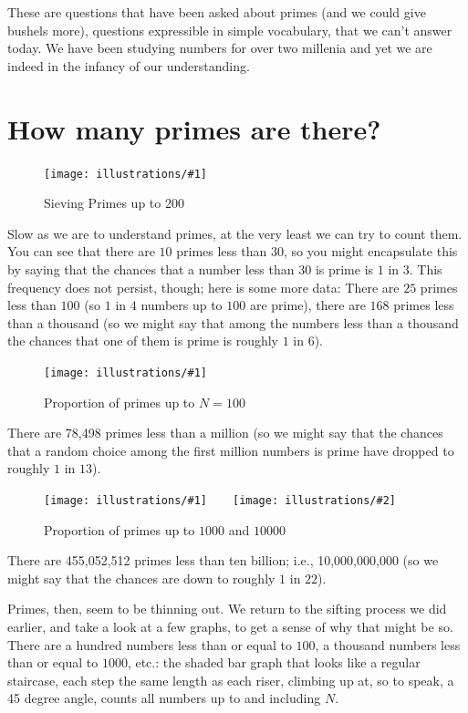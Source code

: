 \documentclass[11pt]{article}
\newcommand{\ill}[3]{ 
   \begin{figure}[htbp]
   \begin{center}
   \texttt{[image: illustrations/\#1]}
   \caption{#3}
   \end{center}
    \end{figure}
}
\newcommand{\illtwo}[4]{ 
   \begin{figure}[htbp]
   \begin{center}
   \texttt{[image: illustrations/\#1]}$\qquad$\texttt{[image: illustrations/\#2]}
   \caption{#4}
    \end{center}
    \end{figure}
}
\theoremstyle{plain}
\theoremstyle{definition}
\numberwithin{equation}{section}
\numberwithin{figure}{section}
\numberwithin{table}{section}
\begin{document}

These are questions that have been asked about primes (and we could
give bushels more), questions expressible in simple vocabulary, that
we can't answer today. We have been studying numbers for over two
millenia and yet we are indeed in the infancy of our understanding.


                           
\section{How many primes are there?}

\ill{sieve200}{.7}{Sieving Primes up to 200}
                                                      
Slow as we are to understand primes, at the very least we can try to
count them. You can see that there are $10$ primes less than $30$, so
you might encapsulate this by saying that the chances that a number
less than $30$ is prime is $1$ in $3$.  This frequency does not
persist, though; here is some more data: There are $25$ primes less
than $100$ (so $1$ in $4$ numbers up to $100$ are prime), there are
$168$ primes less than a thousand (so we might say that among the
numbers less than a thousand the chances that one of them is prime is
roughly $1$ in $6$).
                                                           
\ill{proportion_primes_100}{0.9}{Proportion of primes up to $N=100$}

There are 78,498 primes less than a million (so we might say that
the chances that a random choice among the first million numbers is
prime have dropped to roughly $1$ in $13$).

\illtwo{proportion_primes_1000}{proportion_primes_10000}{0.4}{Proportion of primes up to $1000$ and $10000$}

There are 455,052,512 primes less than ten billion; i.e.,
10,000,000,000 (so we might say that the chances are down to roughly
$1$ in $22$).

Primes, then, seem to be thinning out.  We return to the sifting process
we did earlier, and take a look at a few graphs, to get a sense of why
that might be so. There are a hundred numbers less than or equal to
$100$, a thousand numbers less than or equal to $1000$, etc.: the
shaded bar graph that looks like a regular staircase, each step the
same length as each riser, climbing up at, so to speak, a 45 degree
angle, counts all numbers up to and including $N$.
\end{document}
